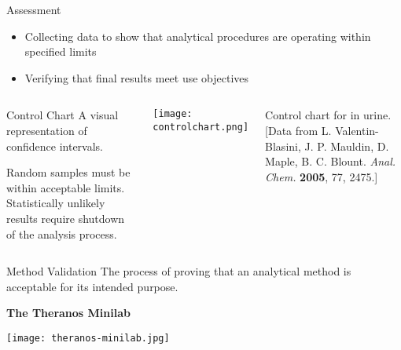 \documentclass[notes=hide]{beamer}
\begin{document}
\begin{frame}{Assessment}
	\begin{itemize}
		\item Collecting data to show that analytical procedures are
			operating \alert{within specified limits}
		\item Verifying that final results meet use objectives
	\end{itemize}

	\begin{columns}
		\begin{block}{Control Chart}
			A visual representation of confidence intervals.
			
			\vspace{1em}

			Random samples must be within acceptable limits.
			Statistically unlikely results require shutdown of the
			analysis process.
		\end{block}
		\tiny
		\begin{center}
			\texttt{[image: controlchart.png]}
		\end{center}

		Control chart for  in urine. [Data from L.
		Valentin-Blasini, J. P. Mauldin, D. Maple, B. C. Blount.
		\textit{Anal. Chem.} \textbf{2005}, 77, 2475.]
	\end{columns}
\end{frame}




\begin{frame}{Method Validation}
	The process of proving that an analytical method is acceptable for its
	intended purpose.

	\begin{center}
		\textbf{The Theranos Minilab}

		\vspace{1em}

		\texttt{[image: theranos-minilab.jpg]}
	\end{center}

\end{frame}
\end{document}
